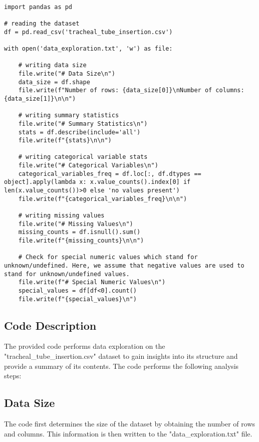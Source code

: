 \documentclass[11pt]{article}
\begin{document}
\begin{verbatim}

import pandas as pd

# reading the dataset
df = pd.read_csv('tracheal_tube_insertion.csv')

with open('data_exploration.txt', 'w') as file:

    # writing data size
    file.write("# Data Size\n")
    data_size = df.shape
    file.write(f"Number of rows: {data_size[0]}\nNumber of columns: {data_size[1]}\n\n")

    # writing summary statistics
    file.write("# Summary Statistics\n")
    stats = df.describe(include='all')
    file.write(f"{stats}\n\n")

    # writing categorical variable stats
    file.write("# Categorical Variables\n")
    categorical_variables_freq = df.loc[:, df.dtypes == object].apply(lambda x: x.value_counts().index[0] if len(x.value_counts())>0 else 'no values present')
    file.write(f"{categorical_variables_freq}\n\n")

    # writing missing values
    file.write("# Missing Values\n")
    missing_counts = df.isnull().sum()
    file.write(f"{missing_counts}\n\n")
    
    # Check for special numeric values which stand for unknown/undefined. Here, we assume that negative values are used to stand for unknown/undefined values.
    file.write(f"# Special Numeric Values\n")
    special_values = df[df<0].count()
    file.write(f"{special_values}\n")

\end{verbatim}

\subsection{Code Description}

The provided code performs data exploration on the "tracheal\_tube\_insertion.csv" dataset to gain insights into its structure and provide a summary of its contents. The code performs the following analysis steps:

\subsection{Data Size}
The code first determines the size of the dataset by obtaining the number of rows and columns. This information is then written to the "data\_exploration.txt" file.
\end{document}

